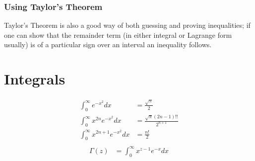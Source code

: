 \documentclass{amsbook}
\theoremstyle{definition}
\theoremstyle{remark}
\begin{document}
\subsection{Using Taylor's Theorem}
Taylor's Theorem is also a good way of both guessing and proving
inequalities; if one can show that the remainder term (in either
integral or Lagrange form usually) is of a particular sign over an
interval an inequality follows.  

\chapter{Integrals}
\begin{align*}
\int_0^\infty e^{-x^2} dx &= \frac{\sqrt{\pi}}{2} \\
\int_0^\infty x^{2n} e^{-x^2} dx &= \frac{\sqrt{\pi} \left(2n-1\right)!!}{2^{n+1}} \\
\int_0^\infty x^{2n+1} e^{-x^2} dx &= \frac{n!}{2}\\
\end{align*}
\begin{align*}
\Gamma(z) &= \int_0^\infty x^{z-1} e^{-x} dx
\end{align*}
\end{document}

